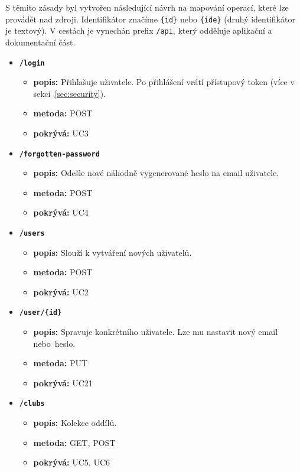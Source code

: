 S těmito zásady byl vytvořen následující návrh na mapování operací, které lze provádět nad zdroji.
Identifikátor značíme \texttt{\{id\}} nebo \texttt{\{ide\}} (druhý identifikátor je textový).
V cestách je vynechán prefix \texttt{/api}, který odděluje aplikační a dokumentační část.

\begin{itemize}
  \item \texttt{\textbf{/login}}
  \begin{itemize}
    \item \textbf{popis:} Přihlašuje uživatele. Po přihlášení vrátí přístupový token (více v sekci~\ref{sec:security}).
    \item \textbf{metoda:} POST
    \item \textbf{pokrývá:} UC3
  \end{itemize}
  \item \texttt{\textbf{/forgotten-password}}
  \begin{itemize}
    \item \textbf{popis:} Odešle nové náhodně vygenerované heslo na email uživatele.
    \item \textbf{metoda:} POST
    \item \textbf{pokrývá:} UC4
  \end{itemize}
  \item \texttt{\textbf{/users}}
  \begin{itemize}
    \item \textbf{popis:} Slouží k vytváření nových uživatelů.
    \item \textbf{metoda:} POST
    \item \textbf{pokrývá:} UC2
  \end{itemize}
  \item \texttt{\textbf{/user/\{id\}}}
  \begin{itemize}
    \item \textbf{popis:} Spravuje konkrétního uživatele. Lze mu nastavit nový email nebo~heslo.
    \item \textbf{metoda:} PUT
    \item \textbf{pokrývá:} UC21
  \end{itemize}
  \item \texttt{\textbf{/clubs}}
  \begin{itemize}
    \item \textbf{popis:} Kolekce oddílů.
    \item \textbf{metoda:} GET, POST
    \item \textbf{pokrývá:} UC5, UC6

\end{itemize}
\end{itemize}
